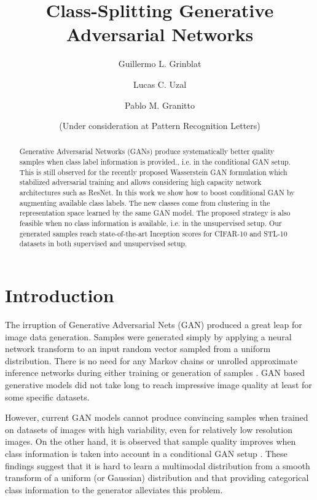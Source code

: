 \documentclass[times,twocolumn]{article}
\begin{document}
\title{Class-Splitting Generative Adversarial Networks}
\author[1]{Guillermo L. Grinblat}
\author[1]{Lucas C. Uzal}
\author[1]{Pablo M. Granitto}
\date{(Under consideration at Pattern Recognition Letters)}
\maketitle

\begin{abstract}
Generative Adversarial Networks (GANs) produce systematically better quality samples when class label information is provided., i.e. in the conditional GAN setup. This is still observed for the recently proposed Wasserstein GAN formulation which stabilized adversarial training and allows considering high capacity network architectures such as ResNet. In this work we show how to boost conditional GAN by augmenting available class labels. The new classes come from clustering in the representation space learned by the same GAN model. The proposed strategy is also feasible when no class information is available, i.e. in the unsupervised setup. Our generated samples reach state-of-the-art Inception scores for CIFAR-10 and STL-10 datasets in both supervised and unsupervised setup.
\end{abstract}

\section{Introduction}
The irruption of Generative Adversarial Nets (GAN) \cite{Goodfellow2014} produced a great leap for image data generation. Samples were generated simply by applying a neural network transform to an input random vector sampled from a uniform distribution. There is no need for any Markov chains or unrolled approximate inference networks during either training or generation of samples \cite{Goodfellow2014}. GAN based generative models did not take long to reach impressive image quality \cite{Radford2015, Salimans2016, Zhao2016, Mao2016} at least for some specific datasets. 

However, current GAN models cannot produce convincing samples when trained on datasets of images with high variability, even for relatively low resolution images. On the other hand, it is observed that sample quality improves when class information is taken into account in a conditional GAN setup \cite{Mirza2014,Odena2017}. These findings suggest that it is hard to learn a multimodal distribution from a smooth transform of a uniform (or Gaussian) distribution and that providing categorical class information to the generator alleviates this problem.
\end{document}
